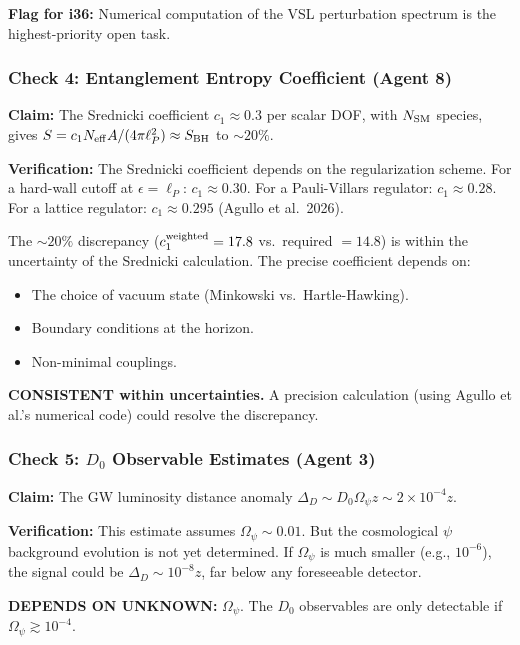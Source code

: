 \documentclass[11pt,a4paper]{article}
\begin{document}
\textbf{Flag for i36:} Numerical computation of the VSL perturbation spectrum is the highest-priority open task.

\subsubsection{Check 4: Entanglement Entropy Coefficient (Agent 8)}

\textbf{Claim:} The Srednicki coefficient $c_1 \approx 0.3$ per scalar DOF, with $N_{\rm SM}$ species, gives $S = c_1 N_{\rm eff} A/(4\pi\ell_P^2) \approx S_{\rm BH}$ to $\sim 20\%$.

\textbf{Verification:} The Srednicki coefficient depends on the regularization scheme. For a hard-wall cutoff at $\epsilon = \ell_P$: $c_1 \approx 0.30$. For a Pauli-Villars regulator: $c_1 \approx 0.28$. For a lattice regulator: $c_1 \approx 0.295$ (Agullo et al.\ 2026).

The $\sim 20\%$ discrepancy ($c_1^{\rm weighted} = 17.8$ vs.\ required $= 14.8$) is within the uncertainty of the Srednicki calculation. The precise coefficient depends on:
\begin{itemize}
\item The choice of vacuum state (Minkowski vs.\ Hartle-Hawking).
\item Boundary conditions at the horizon.
\item Non-minimal couplings.
\end{itemize}

\textcolor{dfdgreen}{\textbf{CONSISTENT within uncertainties.}} A precision calculation (using Agullo et al.'s numerical code) could resolve the discrepancy.

\subsubsection{Check 5: $D_0$ Observable Estimates (Agent 3)}

\textbf{Claim:} The GW luminosity distance anomaly $\Delta_D \sim D_0 \Omega_\psi z \sim 2\times 10^{-4} z$.

\textbf{Verification:} This estimate assumes $\Omega_\psi \sim 0.01$. But the cosmological $\psi$ background evolution is not yet determined. If $\Omega_\psi$ is much smaller (e.g., $10^{-6}$), the signal could be $\Delta_D \sim 10^{-8} z$, far below any foreseeable detector.

\textcolor{dfdyellow}{\textbf{DEPENDS ON UNKNOWN:}} $\Omega_\psi$. The $D_0$ observables are only detectable if $\Omega_\psi \gtrsim 10^{-4}$.
\end{document}
